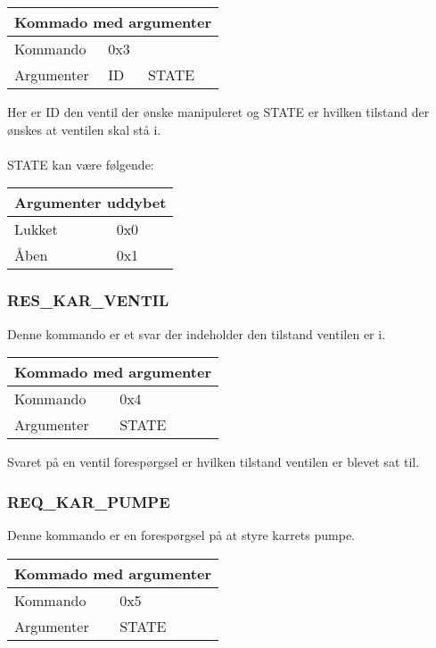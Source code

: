 \begin{table}[H]
\setlength{\parindent}{12pt}
\begin{tabular}{|l|lcc|}
\hline
\multicolumn{4}{|c|}{Kommado med argumenter}\\\hline
Kommando & 0x3 & & \\
Argumenter & ID & STATE & \\\hline
\end{tabular}
\end{table}

Her er ID den ventil der ønske manipuleret og STATE er hvilken tilstand der ønskes at ventilen skal stå i.\\\\
STATE kan være følgende:
\begin{table}[H]
\setlength{\parindent}{12pt}
\begin{tabular}{|l|l|}
\hline
\multicolumn{2}{|c|}{Argumenter uddybet}\\\hline
Lukket & 0x0 \\
Åben & 0x1 \\\hline
\end{tabular}
\end{table}

\subsubsection{RES\_KAR\_VENTIL}
Denne kommando er et svar der indeholder den tilstand ventilen er i.

\begin{table}[H]
\setlength{\parindent}{12pt}
\begin{tabular}{|l|lcc|}
\hline
\multicolumn{4}{|c|}{Kommado med argumenter}\\\hline
Kommando & 0x4 & & \\
Argumenter & STATE & & \\\hline
\end{tabular}
\end{table}

Svaret på en ventil forespørgsel er hvilken tilstand ventilen er blevet sat til.

\subsubsection{REQ\_KAR\_PUMPE}
Denne kommando er en forespørgsel på at styre karrets pumpe.

\begin{table}[H]
\setlength{\parindent}{12pt}
\begin{tabular}{|l|lcc|}
\hline
\multicolumn{4}{|c|}{Kommado med argumenter}\\\hline
Kommando & 0x5 & & \\
Argumenter & STATE & & \\\hline
\end{tabular}
\end{table}

